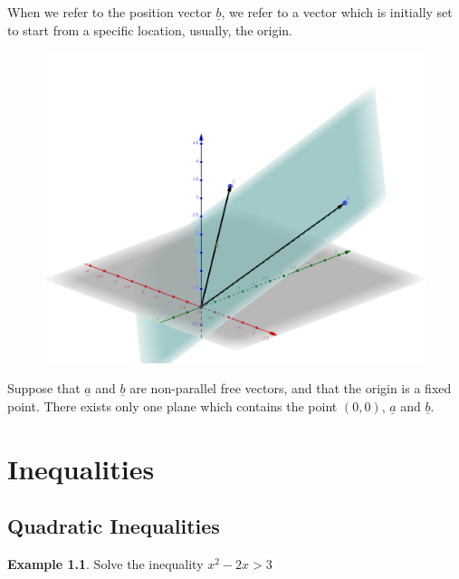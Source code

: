 \documentclass[12pt, a4paper]{report}
\theoremstyle{definition}
\newtheorem{example}{Example}
\begin{document}
	 When we refer to the position vector  $\underline{b}$, we refer to a vector which is initially set to start from a specific location, usually, the origin.\\
		\begin{figure}
		\includegraphics[width=1.3\linewidth]{vect_2} 
	\end{figure}
	 Suppose that  $\underline{a}$ and  $\underline{b}$ are non-parallel free vectors, and that the origin is a fixed point. There exists only one plane which contains the point $(0,0)$,  $\underline{a}$ and  $\underline{b}$.
	 

	

	\newpage
	\chapter{Inequalities}
	\section{Quadratic Inequalities}
	\begin{example}
		Solve the inequality $x^2-2x>3$
	\end{example}
	
\end{document}
